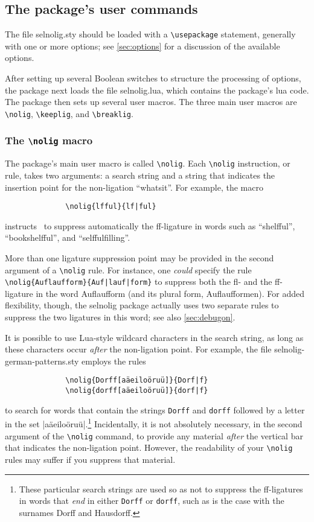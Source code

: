 \documentclass[11pt]{article}
\newcommand{\pkg}[1]{\textsf{#1}}
\newcommand{\opt}[1]{\texttt{#1}}
\newcommand{\cmmd}[1]{\texttt{\textbackslash #1}}
\begin{document}
\subsection{The package's user commands} \label{sec:syntax}

The file \pkg{selnolig.sty} should be loaded with a \cmmd{usepackage} statement, generally with one or more options; see \cref{sec:options} for a discussion of the available options. 

After setting up several Boolean switches to structure the processing of options, the package next loads the file \pkg{selnolig.lua}, which contains the package's lua code. The package then sets up several user macros. The three main user macros are \cmmd{nolig}, \cmmd{keeplig}, and \cmmd{breaklig}.



\subsubsection{The \cmmd{nolig} macro}
\label{sec:nolig}

\enlargethispage{0.3\baselineskip}

The package's main user macro is called \cmmd{nolig}. Each \cmmd{nolig} instruction, or rule, takes two arguments: a search string and a string that indicates the insertion point for the non-ligation \enquote{whatsit}. For example, the macro
\begin{Verbatim}
              \nolig{lfful}{lf|ful}
\end{Verbatim}
instructs \LuaLaTeX\ to suppress automatically the ff-ligature in words such as \enquote{shelfful}, \enquote{bookshelfful}, and \enquote{selffulfilling}. 

More than one ligature suppression point may be provided in the second argument of a \cmmd{nolig} rule. For instance, one \emph{could} specify the rule \Verb+\nolig{Auflaufform}{Auf|lauf|form}+ to suppress both the fl- and the ff-ligature in the word Auflaufform (and its plural form, Auflaufformen). For added flexibility, though, the \pkg{selnolig} package actually uses two separate rules to suppress the two ligatures in this word; see also \cref{sec:debugon}.


It is possible to use Lua-style wildcard characters in the search string, as long as these characters occur \emph{after} the non-ligation point. For example, the file \pkg{selnolig-german-patterns.sty} employs the rules 
\begin{Verbatim}
              \nolig{Dorff[aäeiloöruü]}{Dorf|f}
              \nolig{dorff[aäeiloöruü]}{dorf|f}
\end{Verbatim}
to search for words that contain the strings \opt{Dorff} and \opt{dorff} followed by a letter in the set |aäeiloöruü|.\footnote{These particular search strings are used so as not to suppress the ff-ligatures in words that \emph{end} in either \opt{Dorff} or \opt{dorff}, such as is the case with the surnames Dorff and Hausdorff.} Incidentally, it is not absolutely necessary, in the second argument of the \cmmd{nolig} command, to provide any material \emph{after} the vertical bar that indicates the non-ligation point. However, the readability of your \cmmd{nolig} rules may suffer if you suppress that material.
\end{document}
